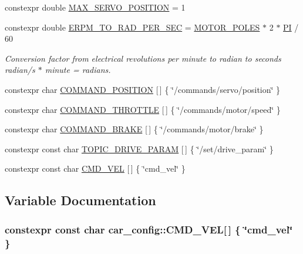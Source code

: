 \begin{DoxyCompactItemize}
constexpr double \hyperlink{namespacecar__config_af1712762f3ad9f8805ba474d5f3e7274}{M\+A\+X\+\_\+\+S\+E\+R\+V\+O\+\_\+\+P\+O\+S\+I\+T\+I\+ON} = 1
\item 
constexpr double \hyperlink{namespacecar__config_a877c4a772a47f4737d9f03fe8a22e106}{E\+R\+P\+M\+\_\+\+T\+O\+\_\+\+R\+A\+D\+\_\+\+P\+E\+R\+\_\+\+S\+EC} = \hyperlink{namespacecar__config_a611a0f02cf52db1d438a2dd53b642cd5}{M\+O\+T\+O\+R\+\_\+\+P\+O\+L\+ES} $\ast$ 2 $\ast$ \hyperlink{namespacecar__config_a90cb9957197db8924811c447bc98703a}{PI} / 60
\begin{DoxyCompactList}\small\item\em Conversion factor from electrical revolutions per minute to radian to seconds  radian/s $\ast$ minute = radians. \end{DoxyCompactList}\item 
constexpr char \hyperlink{namespacecar__config_a6008524bf1090f0ab0c994b2f80dcb22}{C\+O\+M\+M\+A\+N\+D\+\_\+\+P\+O\+S\+I\+T\+I\+ON} \mbox{[}$\,$\mbox{]} \{ \char`\"{}/commands/servo/position\char`\"{} \}
\item 
constexpr char \hyperlink{namespacecar__config_afdb192c52a9126c0bedf2ca4a7c99c2a}{C\+O\+M\+M\+A\+N\+D\+\_\+\+T\+H\+R\+O\+T\+T\+LE} \mbox{[}$\,$\mbox{]} \{ \char`\"{}/commands/motor/speed\char`\"{} \}
\item 
constexpr char \hyperlink{namespacecar__config_ab3b957004ca9df19d509c984937723f7}{C\+O\+M\+M\+A\+N\+D\+\_\+\+B\+R\+A\+KE} \mbox{[}$\,$\mbox{]} \{ \char`\"{}/commands/motor/brake\char`\"{} \}
\item 
constexpr const char \hyperlink{namespacecar__config_a329dea882fb03eb1cec1af42977fa0c6}{T\+O\+P\+I\+C\+\_\+\+D\+R\+I\+V\+E\+\_\+\+P\+A\+R\+AM} \mbox{[}$\,$\mbox{]} \{ \char`\"{}/set/drive\+\_\+param\char`\"{} \}
\item 
constexpr const char \hyperlink{namespacecar__config_aba040863633ec405f179baf953ba002c}{C\+M\+D\+\_\+\+V\+EL} \mbox{[}$\,$\mbox{]} \{ \char`\"{}cmd\+\_\+vel\char`\"{} \}
\end{DoxyCompactItemize}


\subsection{Variable Documentation}
\subsubsection[{\texorpdfstring{C\+M\+D\+\_\+\+V\+EL}{CMD_VEL}}]{\setlength{\rightskip}{0pt plus 5cm}constexpr const char car\+\_\+config\+::\+C\+M\+D\+\_\+\+V\+EL\mbox{[}$\,$\mbox{]} \{ \char`\"{}cmd\+\_\+vel\char`\"{} \}}\hypertarget{namespacecar__config_aba040863633ec405f179baf953ba002c}{}\label{namespacecar__config_aba040863633ec405f179baf953ba002c}


